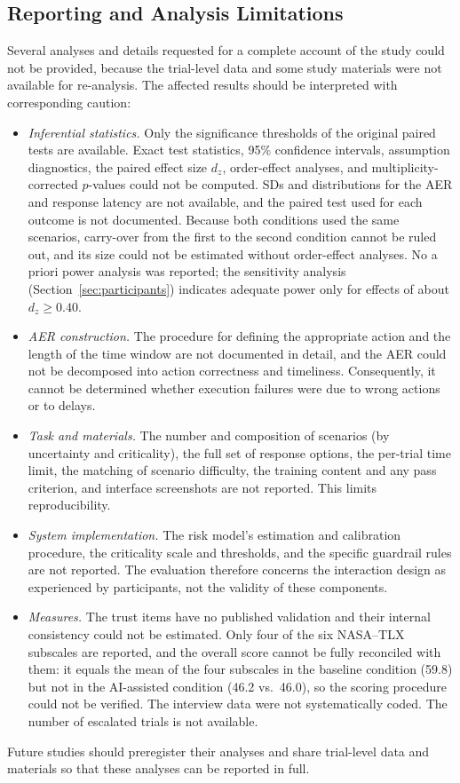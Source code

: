 \documentclass[journal]{IEEEtran}
\theoremstyle{plain}
\theoremstyle{definition}
\providecommand{\DIFaddtex}[1]{{\protect\color{blue} \sf #1}} %
\providecommand{\DIFaddend}{} %
\providecommand{\DIFadd}[1]{\texorpdfstring{\DIFaddtex{#1}}{#1}} %
\DeclareRobustCommand{\DIFaddend}{\DIFOaddend \let\includegraphics\DIFOincludegraphics} %
\begin{document}
    \subsection{\DIFadd{Reporting and Analysis Limitations}}
    \label{sec:lim_reporting}
    \DIFadd{Several analyses and details requested for a complete account of the study could not be provided, because the trial-level data and some study materials were not available for re-analysis. The affected results should be interpreted with corresponding caution:
    }\begin{itemize}
        \item \DIFadd{\emph{Inferential statistics.} Only the significance thresholds of the original paired tests are available. Exact test statistics, 95\% confidence intervals, assumption diagnostics, the paired effect size $d_z$, order-effect analyses, and multiplicity-corrected $p$-values could not be computed. SDs and distributions for the AER and response latency are not available, and the paired test used for each outcome is not documented. Because both conditions used the same scenarios, carry-over from the first to the second condition cannot be ruled out, and its size could not be estimated without order-effect analyses. No a priori power analysis was reported; the sensitivity analysis (Section~\ref{sec:participants}) indicates adequate power only for effects of about $d_z \geq 0.40$.
        }\item \DIFadd{\emph{AER construction.} The procedure for defining the appropriate action and the length of the time window are not documented in detail, and the AER could not be decomposed into action correctness and timeliness. Consequently, it cannot be determined whether execution failures were due to wrong actions or to delays.
        }\item \DIFadd{\emph{Task and materials.} The number and composition of scenarios (by uncertainty and criticality), the full set of response options, the per-trial time limit, the matching of scenario difficulty, the training content and any pass criterion, and interface screenshots are not reported. This limits reproducibility.
        }\item \DIFadd{\emph{System implementation.} The risk model's estimation and calibration procedure, the criticality scale and thresholds, and the specific guardrail rules are not reported. The evaluation therefore concerns the interaction design as experienced by participants, not the validity of these components.
        }\item \DIFadd{\emph{Measures.} The trust items have no published validation and their internal consistency could not be estimated. Only four of the six NASA--TLX subscales are reported, and the overall score cannot be fully reconciled with them: it equals the mean of the four subscales in the baseline condition (59.8) but not in the AI-assisted condition (46.2 vs.\ 46.0), so the scoring procedure could not be verified. The interview data were not systematically coded. The number of escalated trials is not available.
    }\end{itemize}
    \DIFadd{Future studies should preregister their analyses and share trial-level data and materials so that these analyses can be reported in full}\DIFaddend .
\end{document}
